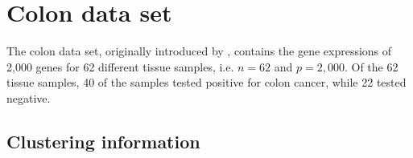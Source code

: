 \documentclass[11pt]{article}
\newcommand{\citeay}[1]{\citeauthor{#1} \citeyear{#1}}
\begin{document}





\section{Colon data set}

The colon data set, originally introduced by \citeay{alon1999broad}, contains the gene expressions of 2,000 genes for 62 different tissue samples, i.e. $n = 62$ and $p = 2,000$. Of the 62 tissue samples, 40 of the samples tested positive for colon cancer, while 22 tested negative. 

\subsection{Clustering information}
\end{document}

